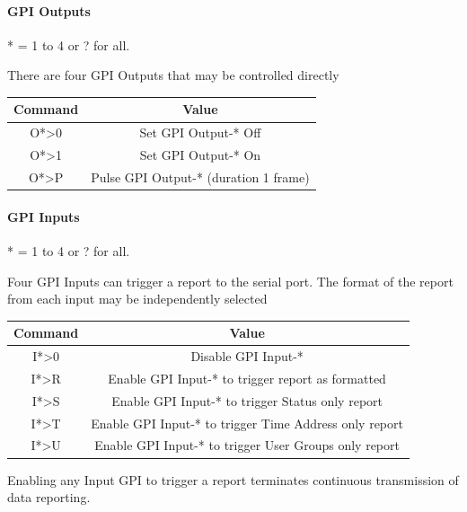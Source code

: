 \documentclass{article}
\begin{document}
			\paragraph{GPI Outputs}\label{gpi-outputs-1}
				\begin{mdframed}[backgroundcolor=yellow!10, linecolor=yellow!80!black]
					* = 1 to 4 or ? for all.
				\end{mdframed}
				There are four GPI Outputs that may be controlled directly
				\begin{center}
					\begin{tabular}{|c|c|}
						\hline
						Command & Value \\
						\hline
			       		O*\textgreater0 & Set GPI Output-* Off \\ 
						O*\textgreater1 & Set GPI Output-* On \\ 
						O*\textgreater P & Pulse GPI Output-* (duration 1 frame) \\
						\hline
					\end{tabular}
				\end{center}

			\paragraph{GPI Inputs}\label{gpi-inputs-1}
				\begin{mdframed}[backgroundcolor=yellow!10, linecolor=yellow!80!black]
					* = 1 to 4 or ? for all.
				\end{mdframed}
				Four GPI Inputs can trigger a report to the serial port. The format of the report from each input may be independently selected

				
				\begin{center}
					\begin{tabular}{|c|c|}
						\hline
						Command & Value \\
						\hline
						I*\textgreater0 & Disable GPI Input-* \\ 
						I*\textgreater R & Enable GPI Input-* to trigger report as formatted \\ 
						I*\textgreater S & Enable GPI Input-* to trigger Status only report \\ 
						I*\textgreater T & Enable GPI Input-* to trigger Time Address only report \\ 
						I*\textgreater U & Enable GPI Input-* to trigger User Groups only report \\
						\hline
					\end{tabular}
				\end{center}
				\begin{mdframed}[backgroundcolor=yellow!10, linecolor=yellow!80!black]
					Enabling any Input GPI to trigger a report terminates
					continuous transmission of data reporting.
				\end{mdframed}
	
\end{document}
